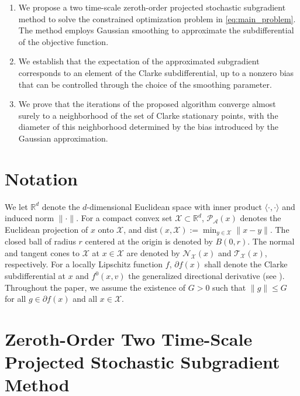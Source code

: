 \documentclass[9pt,journal,twoside,web]{ieeecolor}
\begin{document}
\begin{enumerate}
    \item We propose a two time-scale zeroth-order projected stochastic subgradient method to solve the constrained optimization problem in \eqref{eq:main_problem}. The method employs Gaussian smoothing to approximate the subdifferential of the objective function.
    \item We establish that the expectation of the approximated subgradient corresponds to an element of the Clarke subdifferential, up to a nonzero bias that can be controlled through the choice of the smoothing parameter.
    \item We prove that the iterations of the proposed algorithm converge almost surely to a neighborhood of the set of Clarke stationary points, with the diameter of this neighborhood determined by the bias introduced by the Gaussian approximation.
\end{enumerate}

\section{Notation}

We let $\mathbb{R}^d$ denote the $d$-dimensional Euclidean space with inner product $\langle \cdot, \cdot \rangle$ and induced norm $\| \cdot \|$. For a compact convex set $\mathcal{X} \subset \mathbb{R}^d$, $\mathcal{P}_{\mathcal{A}}(x)$ denotes the Euclidean projection of $x$ onto $\mathcal{X}$, and $\text{dist}(x, \mathcal{X}) := \min_{y \in \mathcal{X}} \|x - y\|$. The closed ball of radius $r$ centered at the origin is denoted by $B(0, r)$. The normal and tangent cones to $\mathcal{X}$ at $x \in \mathcal{X}$ are denoted by $\mathcal{N}_{\mathcal{X}}(x)$ and $\mathcal{T}_{\mathcal{X}}(x)$, respectively. For a locally Lipschitz function $f$, $\partial f(x)$ shall denote the Clarke subdifferential at $x$ and $f^0(x,v)$ the generalized directional derivative (see \cite{clarke1990optimization}). Throughout the paper, we assume the existence of $G>0$ such that $\|g\|\leq G$ for all $g\in \partial f(x)$ and all $x\in\mathcal{X}$.





\section{Zeroth-Order Two Time-Scale Projected Stochastic Subgradient Method}
\end{document}
